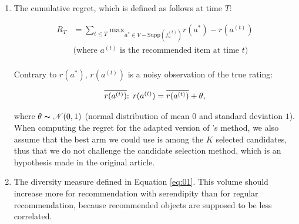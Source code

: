 \documentclass{article}
\begin{document}
\begin{enumerate}
\item The cumulative regret, which is defined as follows at time $T$:

\begin{equation}
\begin{split}
R_{T} & = \sum_{t \leq T} \text{max}_{a^{*} \in V-\text{Supp}(f^{(t)}_{u})} r(a^{*}) - r(a^{(t)})\\
& \mbox{(where $a^{(t)}$ is the recommended item at time $t$)}\\ 
\end{split}
\end{equation}

Contrary to $r(a^{*})$, $r(a^{(t)})$ is a noisy observation of the true rating:

\begin{equation}
\overline{r(a^{(t)})}$: $r(a^{(t)}) = \overline{r(a^{(t)})} + \theta ,
\end{equation}

where $\theta \thicksim \mathscr{N}(0, 1)$ (normal distribution of mean $0$ and standard deviation $1$). When computing the regret for the adapted version of \citet{lagree2017effective}'s method, we also assume that the best arm we could use is among the $K$ selected candidates, thus that we do not challenge the candidate selection method, which is an hypothesis made in the original article.

\item The diversity measure defined in Equation \ref{eq:01}. This volume should increase more for recommendation with serendipity than for regular recommendation, because recommended objects are supposed to be less correlated.

\end{enumerate}
\end{document}
